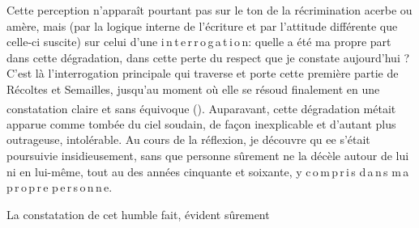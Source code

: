 Cette perception n'apparaît pourtant pas sur le ton de la récrimination acerbe ou amère, mais (par la logique interne de l'écriture et par l'attitude différente que celle-ci suscite) sur celui d'une \mbox{i\,n\,t\,e\,r\,r\,o\,g\,a\,t\,i\,o\,n}: quelle a été ma propre part dans cette dégradation, dans cette perte du respect que je constate aujourd'hui ? C'est là l'interrogation principale qui traverse et porte cette première partie de Récoltes et Semailles, jusqu'au moment où elle se résoud finalement en une constatation claire et sans équivoque (\textsuperscript{}). Auparavant, cette dégradation métait apparue comme tombée du ciel soudain, de façon inexplicable et d'autant plus outrageuse, intolérable. Au cours de la réflexion, je découvre qu ee  s'était  poursuivie insidieusement, sans que personne sûrement ne la décèle autour de lui ni en lui-même, tout au  des années cinquante et soixante, \mbox{y} \mbox{c\,o\,m\,p\,r\,i\,s} \mbox{d\,a\,n\,s} \mbox{m\,a} \mbox{p\,r\,o\,p\,r\,e} \mbox{p\,e\,r\,s\,o\,n\,n\,e}.

 La constatation de cet humble fait,  évident sûrement
